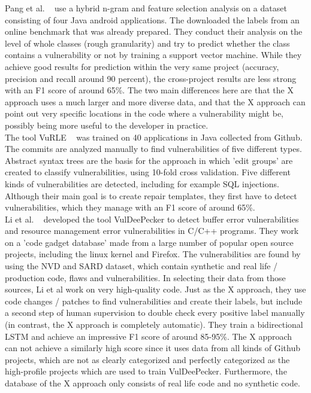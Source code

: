 \documentclass[
	a4paper,
	pagesize,
	pdftex,
	12pt,
	twoside, %
	BCOR=5mm, %
	ngerman,
	fleqn,
	final,
	]{scrartcl}
\begin{document}
Pang et al. ~\cite{Pang.2015} use a hybrid n-gram and feature selection analysis on a dataset consisting of four Java android applications. The downloaded the labels from an online benchmark that was already prepared. They conduct their analysis on the level of whole classes (rough granularity) and try to predict whether the class contains a vulnerability or not by training a support vector machine. While they achieve good results for prediction within the very same project (accuracy, precision and recall around 90 percent), the cross-project results are less strong with an F1 score of around 65\%. The two main differences here are that the X approach uses a much larger and more diverse data, and that the X approach can point out very specific locations in the code where a vulnerability might be, possibly being more useful to the developer in practice.\\

The tool VuRLE ~\cite{Ma.2017} was trained on 40 applications in Java collected from Github. The commits are analyzed manually to find vulnerabilities of five different types. Abstract syntax trees are the basis for the approach in which 'edit groups' are created to classify vulnerabilities, using 10-fold cross validation. Five different kinds of vulnerabilities are detected, including for example SQL injections. Although their main goal is to create repair templates, they first have to detect vulnerabilities, which they manage with an F1 score of around 65\%. \\

Li et al. ~\cite{Li.2018} developed the tool VulDeePecker to detect buffer error vulnerabilities and resource management error vulnerabilities in C/C++ programs. They work on a 'code gadget database' made from a large number of popular open source projects, including the linux kernel and Firefox. The vulnerabilities are found by using the NVD and SARD dataset, which contain synthetic and real life / production code, flaws and vulnerabilities. In selecting their data from those sources, Li et al work on very high-quality code. Just as the X approach, they use code changes / patches to find vulnerabilities and create their labels, but include a second step of human supervision to double check every positive label manually (in contrast, the X approach is completely automatic). They train a bidirectional LSTM and achieve an impressive F1 score of around 85-95\%. The X approach can not achieve a similarly high score since it uses data from all kinds of Github projects, which are not as clearly categorized and perfectly categorized as the high-profile projects which are used to train VulDeePecker. Furthermore, the database of the X approach only consists of real life code and no synthetic code.\\
\end{document}
